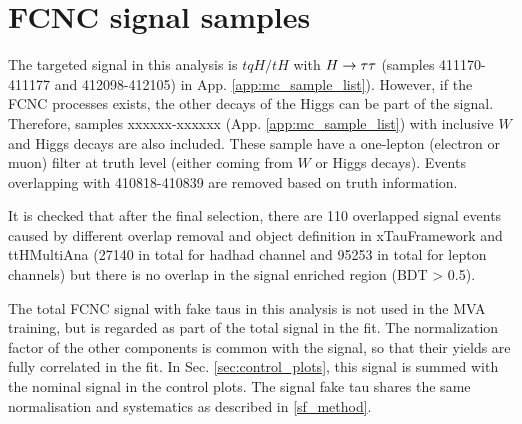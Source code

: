 \section{FCNC signal samples}
\label{sec:fcncbkg}

The targeted signal in this analysis is $tqH/tH$ with $H \rightarrow \tau\tau$ (samples 411170-411177 and 412098-412105) in App. \ref{app:mc_sample_list}).
However, if the FCNC processes exists, the other decays of the Higgs can be part of the signal.
Therefore, samples xxxxxx-xxxxxx (App. \ref{app:mc_sample_list}) with inclusive $W$ and Higgs decays are also included. These sample have a one-lepton (electron or muon) filter at truth level (either coming from $W$ or Higgs decays). Events overlapping with 410818-410839 are removed based on truth information.

It is checked that after the final selection, there are 110 overlapped signal events caused by different overlap removal and object definition in xTauFramework and ttHMultiAna (27140 in total for hadhad channel and 95253 in total for lepton channels) but there is no overlap in the signal enriched region (BDT > 0.5).

The total FCNC signal with fake taus in this analysis is not used in the MVA training, but is regarded as part of the total signal in the fit. The normalization factor of the other components is common with the signal, so that their yields are fully correlated in the fit. In Sec. \ref{sec:control_plots}, this signal is summed with the nominal signal in the control plots. The signal fake tau shares the same normalisation and systematics as described in \ref{sf_method}.



